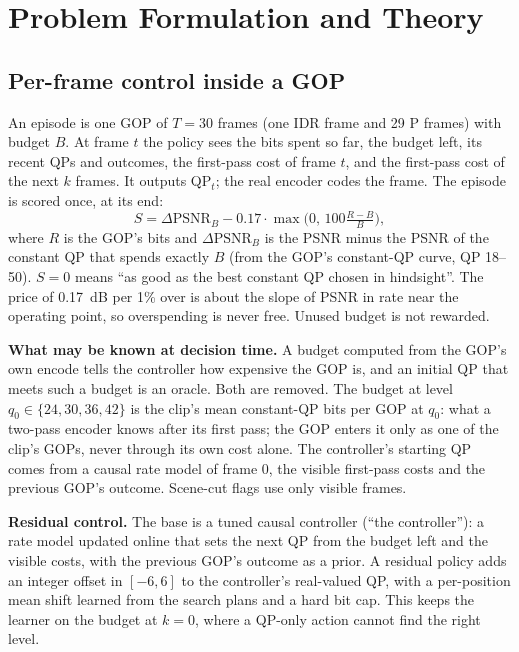 \documentclass[conference]{IEEEtran}
\begin{document}
\section{Problem Formulation and Theory}
\subsection{Per-frame control inside a GOP}
An episode is one GOP of $T{=}30$ frames (one IDR frame and 29 P frames) with budget $B$. At frame $t$ the policy sees the bits spent so far, the budget left, its recent QPs and outcomes, the first-pass cost of frame $t$, and the first-pass cost of the next $k$ frames. It outputs QP$_t$; the real encoder codes the frame. The episode is scored once, at its end:
\begin{equation}
S = \Delta\mathrm{PSNR}_B - 0.17\cdot \max\!\Big(0,\,100\tfrac{R-B}{B}\Big),
\end{equation}
where $R$ is the GOP's bits and $\Delta\mathrm{PSNR}_B$ is the PSNR minus the PSNR of the constant QP that spends exactly $B$ (from the GOP's constant-QP curve, QP 18--50). $S{=}0$ means ``as good as the best constant QP chosen in hindsight''. The price of 0.17~dB per 1\% over is about the slope of PSNR in rate near the operating point, so overspending is never free. Unused budget is not rewarded.

\textbf{What may be known at decision time.} A budget computed from the GOP's own encode tells the controller how expensive the GOP is, and an initial QP that meets such a budget is an oracle. Both are removed. The budget at level $q_0\in\{24,30,36,42\}$ is the clip's mean constant-QP bits per GOP at $q_0$: what a two-pass encoder knows after its first pass; the GOP enters it only as one of the clip's GOPs, never through its own cost alone. The controller's starting QP comes from a causal rate model of frame 0, the visible first-pass costs and the previous GOP's outcome. Scene-cut flags use only visible frames.

\textbf{Residual control.} The base is a tuned causal controller (``the controller''): a rate model updated online that sets the next QP from the budget left and the visible costs, with the previous GOP's outcome as a prior. A residual policy adds an integer offset in $[-6,6]$ to the controller's real-valued QP, with a per-position mean shift learned from the search plans and a hard bit cap. This keeps the learner on the budget at $k{=}0$, where a QP-only action cannot find the right level.
\end{document}
